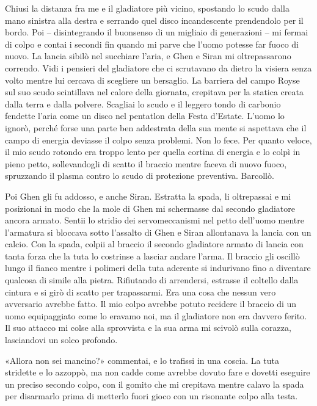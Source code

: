 Chiusi la distanza fra me e il gladiatore più vicino, spostando lo scudo
dalla mano sinistra alla destra e serrando quel disco incandescente
prendendolo per il bordo. Poi -- disintegrando il buonsenso di un
migliaio di generazioni -- mi fermai di colpo e contai i secondi fin
quando mi parve che l'uomo potesse far fuoco di nuovo. La lancia sibilò
nel succhiare l'aria, e Ghen e Siran mi oltrepassarono correndo. Vidi i
pensieri del gladiatore che ci scrutavano da dietro la visiera senza
volto mentre lui cercava di scegliere un bersaglio. La barriera del
campo Royse sul suo scudo scintillava nel calore della giornata,
crepitava per la statica creata dalla terra e dalla polvere. Scagliai lo
scudo e il leggero tondo di carbonio fendette l'aria come un disco nel
pentatlon della Festa d'Estate. L'uomo lo ignorò, perché forse una parte
ben addestrata della sua mente si aspettava che il campo di energia
deviasse il colpo senza problemi. Non lo fece. Per quanto veloce, il mio
scudo rotondo era troppo lento per quella cortina di energia e lo colpì
in pieno petto, sollevandogli di scatto il braccio mentre faceva di
nuovo fuoco, spruzzando il plasma contro lo scudo di protezione
preventiva. Barcollò.

Poi Ghen gli fu addosso, e anche Siran. Estratta la spada, li
oltrepassai e mi posizionai in modo che la mole di Ghen mi schermasse
dal secondo gladiatore ancora armato. Sentii lo stridio dei
servomeccanismi nel petto dell'uomo mentre l'armatura si bloccava sotto
l'assalto di Ghen e Siran allontanava la lancia con un calcio. Con la
spada, colpii al braccio il secondo gladiatore armato di lancia con
tanta forza che la tuta lo costrinse a lasciar andare l'arma. Il braccio
gli oscillò lungo il fianco mentre i polimeri della tuta aderente si
indurivano fino a diventare qualcosa di simile alla pietra. Rifiutando
di arrendersi, estrasse il coltello dalla cintura e si girò di scatto
per trapassarmi. Era una cosa che nessun vero avversario avrebbe fatto.
Il mio colpo avrebbe potuto recidere il braccio di un uomo equipaggiato
come lo eravamo noi, ma il gladiatore non era davvero ferito. Il suo
attacco mi colse alla sprovvista e la sua arma mi scivolò sulla corazza,
lasciandovi un solco profondo.

«Allora non sei mancino?» commentai, e lo trafissi in una coscia. La
tuta stridette e lo azzoppò, ma non cadde come avrebbe dovuto fare e
dovetti eseguire un preciso secondo colpo, con il gomito che mi
crepitava mentre calavo la spada per disarmarlo prima di metterlo fuori
gioco con un risonante colpo alla testa.

